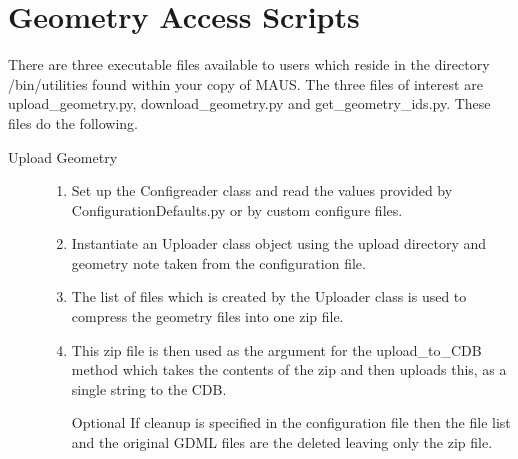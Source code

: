 \section{Geometry Access Scripts}

There are three executable files available to users which reside in
the directory /bin/utilities found within your copy of MAUS. The three
files of interest are upload\_geometry.py, download\_geometry.py
and get\_geometry\_ids.py. These files do the following.

\begin{description}
  \item[Upload Geometry] \hfill 
  \begin{enumerate}
   \item Set up the Configreader class and read the values provided by
   ConfigurationDefaults.py or by custom configure files.
   \item Instantiate an Uploader class object using the upload
   directory and geometry note taken from the configuration file.
   \item The list of files which is created by the Uploader class is
   used to compress the geometry files into one zip file.
   \item This zip file is then used as the argument for the
upload\_to\_CDB method which takes the contents of the zip and then
uploads this, as a single string to the CDB.
   \item[Optional] If cleanup is specified in the configuration file
then the file list and the original GDML files are the deleted leaving
only the zip file.
  \end{enumerate}


\end{description}
